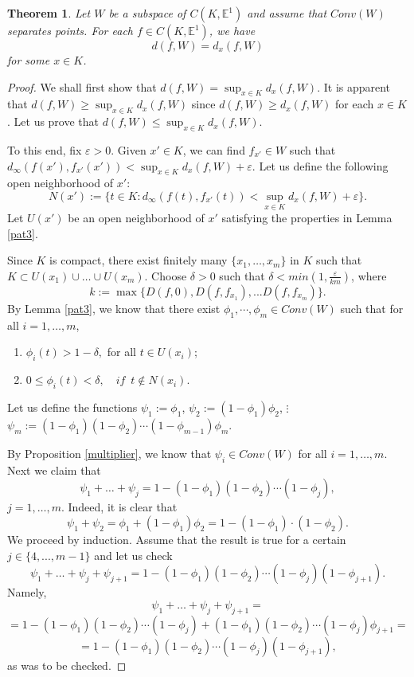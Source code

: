 \documentclass[10pt,a4paper]{amsart}
\newtheorem{theorem}{Theorem}
\begin{document}
\begin{theorem} \label{main} Let $W$ be a subspace of $C(K,\mathbb{E}^1)$ and assume that $Conv(W)$ separates points.
For each $f \in C(K,\mathbb{E}^1)$, we have
\[d(f,W)=d_x(f,W)\]
for some $x\in K$.
\end{theorem}

\begin{proof}
We shall first show that $d(f,W)=\sup_{x\in K}d_x(f,W)$. It is apparent that $d(f,W)\ge \sup_{x\in K}d_x(f,W)$ since $d(f,W)\ge d_x(f,W)$ for each $x\in K$.
Let us prove that $d(f,W)\le \sup_{x\in K}d_x(f,W)$.

To this end, fix $\varepsilon > 0$. Given $x'\in K$, we can find $f_{x'}\in W$ such that $d_{\infty}(f(x'),f_{x'}(x'))<\sup_{x\in K}d_x(f,W)+\varepsilon$.
Let us define the following open neighborhood of $x'$:
$$N(x'):= \{ t \in K: d_\infty (f(t), f_{x'}(t)) < \sup_{x\in K}d_x(f,W)+\varepsilon \}.$$
Let  $U(x')$ be an open neighborhood of $x'$ satisfying the properties in Lemma \ref{pat3}.


Since $K$ is compact, there exist finitely many $\{ x_1,	\ldots , x_m \}$ in $K$ such that $K \subset U(x_1) \cup \ldots \cup U(x_m)$.
Choose $\delta>0$ such that $\delta<min(1, \frac{\varepsilon}{km})$, where
\[k:=\max \{D(f,0), D(f, f_{x_1}),...D(f, f_{x_m})\}.\]
By Lemma \ref{pat3}, we know that there exist $\phi_1, \cdots, \phi_m \in Conv(W)$ such that for all $i=1, \ldots, m$,
\begin{enumerate}
\item[(i)] $\phi_i (t) > 1 - \delta,$ for all $t \in U(x_i)$;
\item[(ii)] $0 \le \phi_i (t) < \delta,\quad if  \enspace  t \notin N(x_i)$.
\end{enumerate}

Let us define the functions
\newline
$\psi_1 := \phi_1$,
\newline
$\psi_2 := ( 1 - \phi_1) \phi_2$,
\newline
$\vdots$
\newline
$\psi_m := ( 1 - \phi_1)( 1 - \phi_2) \cdots ( 1 - \phi_{m-1}) \phi_{m}$.

By Proposition \ref{multiplier}, we know that $\psi_i \in Conv(W)$ for all $i=1,\ldots,m$.
Next we claim that
$$\psi_1+\ldots+\psi_j= 1 - ( 1 - \phi_1)( 1 - \phi_2) \cdots ( 1 - \phi_j),$$ $j=1,\ldots,m .$
Indeed, it is clear that
$$\psi_1 + \psi_2 = \phi_1  + (1 - \phi_1) \phi_2= 1-(1-\phi_1)\cdot(1-\phi_2).$$
We proceed by induction. Assume that the result is true for a certain $j\in\{4,...,m-1\}$ and let us check
$$\psi_1+\ldots+\psi_j+\psi_{j+1}= 1 - ( 1 - \phi_1)( 1 - \phi_2) \cdots ( 1 - \phi_j) ( 1 - \phi_{j+1}).$$
Namely,
$$\psi_1+\ldots+\psi_j+\psi_{j+1}=$$
$$=1 - ( 1 - \phi_1)( 1 - \phi_2) \cdots ( 1 - \phi_j)+( 1 - \phi_1)( 1 - \phi_2) \cdots ( 1 - \phi_{j}) \phi_{j+1}=$$
$$=1 - ( 1 - \phi_1)( 1 - \phi_2) \cdots ( 1 - \phi_j) ( 1 - \phi_{j+1}),$$
as was to be checked.


\end{proof}
\end{document}
